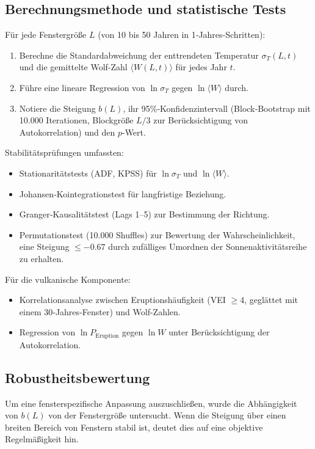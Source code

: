 \documentclass[12pt,a4paper]{article}
\begin{document}
	\subsection{Berechnungsmethode und statistische Tests}
	
	Für jede Fenstergröße \(L\) (von 10 bis 50 Jahren in 1‑Jahres‑Schritten):
	\begin{enumerate}
		\item Berechne die Standardabweichung der enttrendeten Temperatur \(\sigma_T(L,t)\) und die gemittelte Wolf-Zahl \(\langle W(L,t) \rangle\) für jedes Jahr \(t\).
		\item Führe eine lineare Regression von \(\ln \sigma_T\) gegen \(\ln \langle W \rangle\) durch.
		\item Notiere die Steigung \(b(L)\), ihr 95\%-Konfidenzintervall (Block‑Bootstrap mit 10.000 Iterationen, Blockgröße \(L/3\) zur Berücksichtigung von Autokorrelation) und den \(p\)-Wert.
	\end{enumerate}
	
	Stabilitätsprüfungen umfassten:
	\begin{itemize}
		\item Stationaritätstests (ADF, KPSS) für \(\ln \sigma_T\) und \(\ln \langle W \rangle\).
		\item Johansen‑Kointegrationstest für langfristige Beziehung.
		\item Granger‑Kausalitätstest (Lags 1–5) zur Bestimmung der Richtung.
		\item Permutationstest (10.000 Shuffles) zur Bewertung der Wahrscheinlichkeit, eine Steigung \(\le -0.67\) durch zufälliges Umordnen der Sonnenaktivitätsreihe zu erhalten.
	\end{itemize}
	
	Für die vulkanische Komponente:
	\begin{itemize}
		\item Korrelationsanalyse zwischen Eruptionshäufigkeit (VEI \(\ge 4\), geglättet mit einem 30‑Jahres‑Fenster) und Wolf-Zahlen.
		\item Regression von \(\ln P_{\text{Eruption}}\) gegen \(\ln W\) unter Berücksichtigung der Autokorrelation.
	\end{itemize}
	
	\subsection{Robustheitsbewertung}
	
	Um eine fensterspezifische Anpassung auszuschließen, wurde die Abhängigkeit von \(b(L)\) von der Fenstergröße untersucht. Wenn die Steigung über einen breiten Bereich von Fenstern stabil ist, deutet dies auf eine objektive Regelmäßigkeit hin.
	
\end{document}
